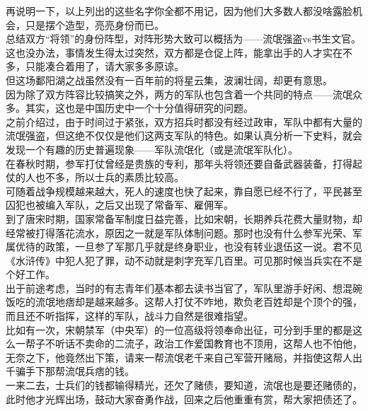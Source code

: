 \begin{multicols}{\theparacolNo}
再说明一下，以上列出的这些名字你全都不用记，因为他们大多数人都没啥露脸机会，只是摆个造型，亮亮身份而已。\\

总结双方“将领”的身份阵型，对阵形势大致可以概括为——流氓强盗vs书生文官。\\

这也没办法，事情发生得太过突然，双方都是仓促上阵，能拿出手的人才实在不多，只能凑合着用了，请大家多多原谅。\\

但这场鄱阳湖之战虽然没有一百年前的将星云集，波澜壮阔，却更有意思。\\

因为除了双方阵容比较搞笑之外，两方的军队也包含着一个共同的特点——流氓众多。其实，这也是中国历史中一个十分值得研究的问题。\\

之前介绍过，由于时间过于紧张，双方招兵时都没有经过政审，军队中都有大量的流氓强盗，但这绝不仅仅是他们这两支军队的特色。如果认真分析一下史料，就会发现一个有趣的历史普遍现象——军队流氓化（或是流氓军队化）。\\

在春秋时期，参军打仗曾经是贵族的专利，那年头将领还要自备武器装备，打得起仗的人也不多，所以士兵的素质比较高。\\

可随着战争规模越来越大，死人的速度也快了起来，靠自愿已经不行了，平民甚至囚犯也被编入军队，之后又出现了常备军、雇佣军。\\

到了唐宋时期，国家常备军制度日益完善，比如宋朝，长期养兵花费大量财物，却经常被打得落花流水，原因之一就是军队体制问题。那时也没有什么参军光荣、军属优待的政策，一旦参了军那几乎就是终身职业，也没有转业退伍这一说。君不见《水浒传》中犯人犯了罪，动不动就是刺字充军几百里。可见那时候当兵实在不是个好工作。\\

出于前途考虑，当时的有志青年们基本都去读书当官了，军队里游手好闲、想混碗饭吃的流氓地痞却是越来越多。这帮人打仗不咋地，欺负老百姓却是个顶个的强，而且还不听指挥，这样的军队，战斗力自然是很难指望。\\

比如有一次，宋朝禁军（中央军）的一位高级将领奉命出征，可分到手里的都是这么一帮子不听话不卖命的二流子，政治工作爱国教育也不顶用，这帮人也不怕他，无奈之下，他竟然出下策，请来一帮流氓老千来自己军营开赌局，并指使这帮人出千骗手下那帮流氓兵痞的钱。\\

一来二去，士兵们的钱都输得精光，还欠了赌债，要知道，流氓也是要还赌债的，此时他才光辉出场，鼓动大家奋勇作战，回来之后他重重有赏，帮大家把债还了。\\


\end{multicols}
